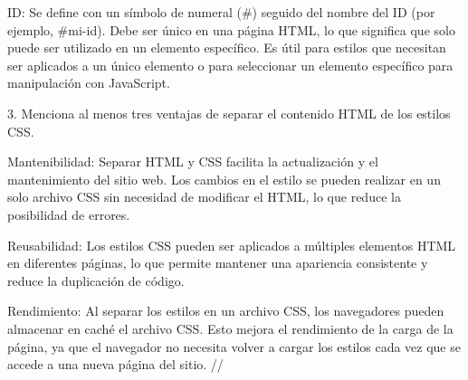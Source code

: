 ID: Se define con un símbolo de numeral (#) seguido del nombre del ID (por ejemplo, #mi-id).
Debe ser único en una página HTML, lo que significa que solo puede ser utilizado en un elemento específico.
Es útil para estilos que necesitan ser aplicados a un único elemento o para seleccionar un elemento específico para manipulación con JavaScript.

3. Menciona al menos tres ventajas de separar el contenido HTML de los estilos CSS.

Mantenibilidad:
Separar HTML y CSS facilita la actualización y el mantenimiento del sitio web. Los cambios en el estilo se pueden realizar en un solo archivo CSS sin necesidad de modificar el HTML, lo que reduce la posibilidad de errores.

Reusabilidad:
Los estilos CSS pueden ser aplicados a múltiples elementos HTML en diferentes páginas, lo que permite mantener una apariencia consistente y reduce la duplicación de código.

Rendimiento:
Al separar los estilos en un archivo CSS, los navegadores pueden almacenar en caché el archivo CSS. Esto mejora el rendimiento de la carga de la página, ya que el navegador no necesita volver a cargar los estilos cada vez que se accede a una nueva página del sitio.
//
